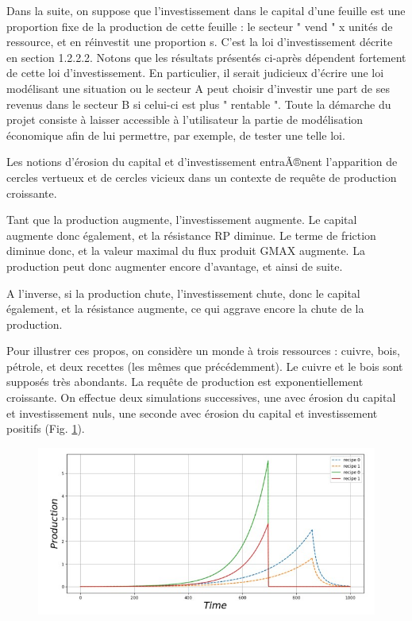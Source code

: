 \documentclass[12pt,a4paper]{article}%
\begin{document}
Dans la suite, on suppose que l'investissement dans le capital d'une feuille
est une proportion fixe de la production de cette feuille : le secteur " vend
" x unités de ressource, et en réinvestit une proportion s. C'est la loi
d'investissement décrite en section 1.2.2.2. Notons que les résultats
présentés ci-après dépendent fortement de cette loi d'investissement. En
particulier, il serait judicieux d'écrire une loi modélisant une situation ou
le secteur A peut choisir d'investir une part de ses revenus dans le secteur B
si celui-ci est plus " rentable ". Toute la démarche du projet consiste à
laisser accessible à l'utilisateur la partie de modélisation économique
afin de lui permettre, par exemple, de tester une telle loi.

Les notions d'érosion du capital et d'investissement entraÃ®nent l'apparition
de cercles vertueux et de cercles vicieux dans un contexte de requête de
production croissante.

Tant que la production augmente, l'investissement augmente. Le capital
augmente donc également, et la résistance RP diminue. Le terme de friction
diminue donc, et la valeur maximal du flux produit GMAX augmente. La
production peut donc augmenter encore d'avantage, et ainsi de suite.

A l'inverse, si la production chute, l'investissement chute, donc le capital
également, et la résistance augmente, ce qui aggrave encore la chute de la production.

Pour illustrer ces propos, on considère un monde à trois ressources :
cuivre, bois, pétrole, et deux recettes (les mêmes que précédemment). Le
cuivre et le bois sont supposés très abondants. La requête de production
est exponentiellement croissante. On effectue deux simulations successives,
une avec érosion du capital et investissement nuls, une seconde avec érosion
du capital et investissement positifs (Fig. \ref{Fig13}).

\begin{figure}[h]
\centering
\includegraphics[width=1.0\textwidth]{figures/Production13.jpg}\label{Fig13}\end{figure}
\end{document}
